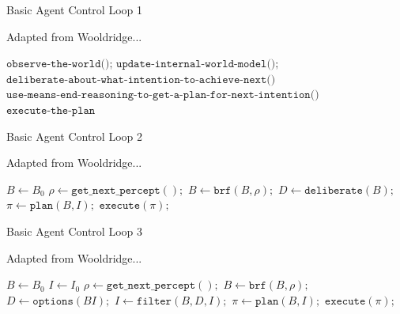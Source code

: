 \documentclass[aspectratio=1610,xcolor=dvipsnames,t]{beamer}
\begin{document}
\begin{frame}{Basic Agent Control Loop 1}
    \begin{block}{Adapted from Wooldridge...}
        \begin{algorithmic}[0]
                    \State $\texttt{observe-the-world();}$ 
                    \State $\texttt{update-internal-world-model();}$
                    \State $\texttt{deliberate-about-what-intention-to-achieve-next()}$
                    \State $\texttt{use-means-end-reasoning-to-get-a-plan-for-next-intention()}$
                    \State $\texttt{execute-the-plan}$
                \EndWhile
            \EndProcedure
        \end{algorithmic} 
    \end{block} 
\end{frame} 

\begin{frame}{Basic Agent Control Loop 2} 
    \begin{block}{Adapted from Wooldridge...} 
        \begin{algorithmic}[0] 
                \State $B \gets B_0$
                    \State $\rho \gets \texttt{get\_next\_percept}();$
                    \State $B \gets \texttt{brf}(B, \rho);$
                    \State $D \gets \texttt{deliberate}(B);$ 
                    \State $\pi \gets \texttt{plan}(B, I); $
                    \State $\texttt{execute}(\pi); $
                \EndWhile
            \EndProcedure
        \end{algorithmic} 
    \end{block} 
\end{frame} 

\begin{frame}{Basic Agent Control Loop 3} 
    \begin{block}{Adapted from Wooldridge...} 
        \begin{algorithmic}[0] 
                \State $B \gets B_0$
                \State $I \gets I_0$
                    \State $\rho \gets \texttt{get\_next\_percept}();$
                    \State $B \gets \texttt{brf}(B, \rho);$
                    \State $D \gets \texttt{options}(B I);$ 
                    \State $I \gets \texttt{filter}(B, D, I); $
                    \State $\pi \gets \texttt{plan}(B, I); $
                    \State $\texttt{execute}(\pi); $
                \EndWhile
            \EndProcedure
        \end{algorithmic} 
    \end{block} 
\end{frame} 
\end{document}
